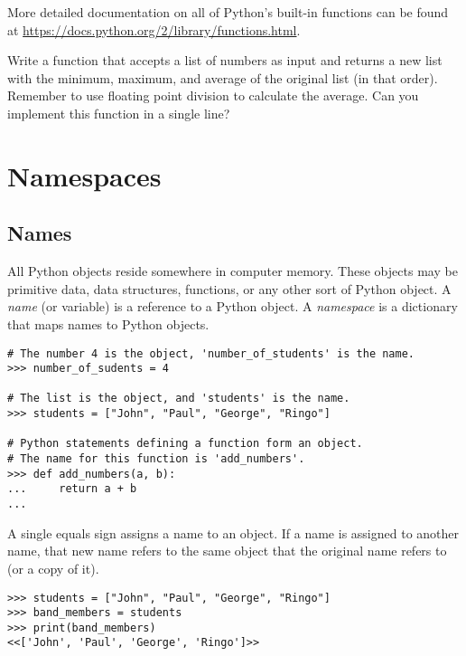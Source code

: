 More detailed documentation on all of Python's built-in functions can be found at \url{https://docs.python.org/2/library/functions.html}.

\begin{problem} %
Write a function that accepts a list of numbers as input and returns a new list with the minimum, maximum, and average of the original list (in that order).
Remember to use floating point division to calculate the average.
Can you implement this function in a single line?
\end{problem}

\section*{Namespaces} %

\subsection*{Names} %
All Python objects reside somewhere in computer memory.
These objects may be primitive data, data structures, functions, or any other sort of Python object.
A \emph{name} (or variable) is a reference to a Python object.
A \emph{namespace} is a dictionary that maps names to Python objects.

\begin{lstlisting}
# The number 4 is the object, 'number_of_students' is the name.
>>> number_of_sudents = 4

# The list is the object, and 'students' is the name.
>>> students = ["John", "Paul", "George", "Ringo"]

# Python statements defining a function form an object.
# The name for this function is 'add_numbers'.
>>> def add_numbers(a, b):
...     return a + b
... 
\end{lstlisting}

A single equals sign assigns a name to an object.
If a name is assigned to another name, that new name refers to the same object that the original name refers to (or a copy of it).

\begin{lstlisting}
>>> students = ["John", "Paul", "George", "Ringo"]
>>> band_members = students
>>> print(band_members)
<<['John', 'Paul', 'George', 'Ringo']>>
\end{lstlisting}

